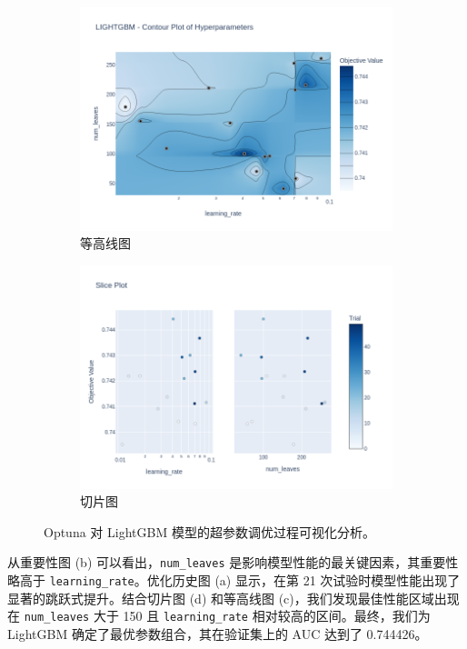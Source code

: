 \documentclass{thuemp}
\begin{document}
\begin{figure}[H]
    \vspace{0.5cm}

    \begin{subfigure}[b]{0.49\textwidth}
        \centering
        \includegraphics[width=\textwidth]{image/results/lightgbm_contour_plot.png} %
        \caption{等高线图}
        \label{fig:lgb_contour}
    \end{subfigure}
    \hfill
    \begin{subfigure}[b]{0.49\textwidth}
        \centering
        \includegraphics[width=\textwidth]{image/results/lightgbm_param_vs_target_slice.png} %
        \caption{切片图}
        \label{fig:lgb_slice}
    \end{subfigure}
    
    \caption{Optuna 对 LightGBM 模型的超参数调优过程可视化分析。}
    \label{fig:optuna_lightgbm}
\end{figure}
从重要性图 (b) 可以看出，\texttt{num\_leaves} 是影响模型性能的最关键因素，其重要性略高于 \texttt{learning\_rate}。优化历史图 (a) 显示，在第 21 次试验时模型性能出现了显著的跳跃式提升。结合切片图 (d) 和等高线图 (c)，我们发现最佳性能区域出现在 \texttt{num\_leaves} 大于 150 且 \texttt{learning\_rate} 相对较高的区间。最终，我们为 LightGBM 确定了最优参数组合，其在验证集上的 AUC 达到了 0.744426。
\end{document}
